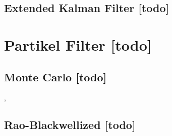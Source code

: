 \subsection{Extended Kalman Filter [todo]}



\begin{comment}
------------------------------------------------------------------------------------------
\end{comment}
\section{Partikel Filter [todo]}

\begin{comment}
------------------------------------------------------------------------------------------
- \cite{kurth2003experimental}
	- Monte Carlo localization, or particle ltering, provides a method of representing multimodal distri-butions for position estimation [4, 12], with the ad-vantage that the computational requirements can be scaled. The main advantage of these methods is their ability to recover robustly from a poor initial condition.
\end{comment}
\subsection{Monte Carlo [todo]}

\cite{fox1999monte}, 

\begin{comment}
------------------------------------------------------------------------------------------
Rao-Blackwellized Particle Filtering
https://people.eecs.berkeley.edu/~pabbeel/cs287-fa12/slides/RBPF.pdf
\end{comment}
\subsection{Rao-Blackwellized [todo]}


\begin{comment}
------------------------------------------------------------------------------------------
- \cite{kurth2003experimental}
	- We are currently developing a batch localization method, which considers all the data collected by the robot and nds the best path estimate given all the data. Although time consuming computationally, this will produce the theoretically optimal result obtainable from the collected data; we can then evaluate the results of our online localization method by comparing to this optimal solution.
\end{comment}
